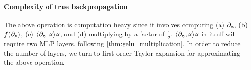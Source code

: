 \layernormbackprop*
\paragraph{Complexity of true backpropagation} The above operation is computation heavy since it involves computing (a) $\partial_{ {\bm{z}} }$, (b) $f( \partial_{ {\bm{z}} } )$, (c) $\langle \partial_{ {\bm{z}} }, {\bm{z}} \rangle {\bm{z}}$, and (d) multiplying by a factor of $\frac{1}{\sigma}$. $\langle \partial_{ {\bm{z}} }, {\bm{z}} \rangle {\bm{z}}$ in itself will require two MLP layers, following \cref{thm:gelu_multiplication}. In order to reduce the number of layers, we turn to first-order Taylor expansion for approximating the above operation.

